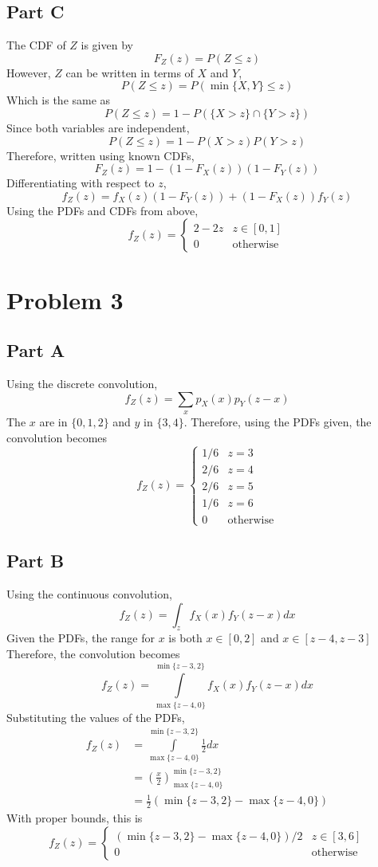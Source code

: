 \documentclass{article}
\begin{document}
\subsection*{Part C}

The CDF of $Z$ is given by
$$ F_Z(z) = P(Z \leq z) $$
However, $Z$ can be written in terms of $X$ and $Y$,
$$ P(Z \leq z) = P(\min\{X, Y\} \leq z) $$
Which is the same as
$$ P(Z \leq z) = 1 - P(\{X > z\} \cap \{Y > z\}) $$
Since both variables are independent,
$$ P(Z \leq z) = 1 - P(X > z) P(Y > z) $$
Therefore, written using known CDFs,
$$ F_Z(z) = 1 - (1 - F_X(z)) (1 - F_Y(z)) $$
Differentiating with respect to $z$,
$$ f_Z(z) = f_X(z) (1 - F_Y(z)) + (1 - F_X(z)) f_Y(z) $$
Using the PDFs and CDFs from above,
$$ f_Z(z) = \begin{cases}
  2 - 2z & z \in [0, 1] \\
  0 & \mathrm{otherwise}
\end{cases} $$

\section*{Problem 3}

\subsection*{Part A}

Using the discrete convolution,
$$ f_Z(z) = \sum_x p_X(x) p_Y(z - x) $$
The $x$ are in $\{0, 1, 2\}$ and $y$ in $\{3, 4\}$. Therefore, using the PDFs
given, the convolution becomes
$$ f_Z(z) = \begin{cases}
  1 / 6 & z = 3 \\
  2 / 6 & z = 4 \\
  2 / 6 & z = 5 \\
  1 / 6 & z = 6 \\
  0 & \mathrm{otherwise}
\end{cases} $$

\subsection*{Part B}

Using the continuous convolution,
$$ f_Z(z) = \int_z f_X(x) f_Y(z - x) dx $$
Given the PDFs, the range for $x$ is both $x \in [0, 2]$ and $x \in [z - 4, z
- 3]$ Therefore, the convolution becomes
$$ f_Z(z) = \int\limits_{\max\{z - 4, 0\}}^{\min\{z - 3, 2\}} f_X(x) f_Y(z -
x) dx $$
Substituting the values of the PDFs,
\begin{align*}
  f_Z(z) &= \int\limits_{\max\{z - 4, 0\}}^{\min\{z - 3, 2\}} \frac{1}{2} dx \\
  &= \left( \frac{x}{2} \right)_{\max\{z - 4, 0\}}^{\min\{z - 3, 2\}} \\
  &= \frac{1}{2}(\min\{z - 3, 2\} - \max\{z - 4, 0\})
\end{align*}
With proper bounds, this is
$$ f_Z(z) = \begin{cases}
  (\min\{z - 3, 2\} - \max\{z - 4, 0\}) / 2 & z \in [3, 6] \\
  0 & \mathrm{otherwise}
\end{cases} $$
\end{document}
